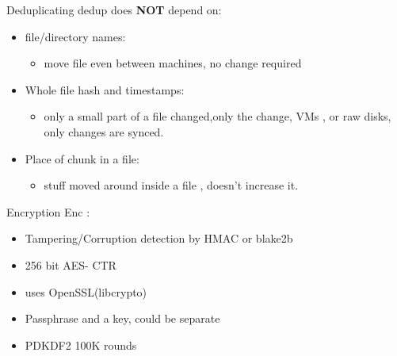 \documentclass{beamer}
\begin{document}
\begin{frame}{Deduplicating}
	dedup does \textbf{NOT} depend on:
	\begin{itemize}
		\item file/directory names: 
		\begin{itemize}
			\item move file even between machines, no change required
		\end{itemize}
		 \item Whole file hash and timestamps:
		 \begin{itemize} 
		 	\item only a small part of a file changed,only the change, VMs , or raw disks, only changes are synced.
		\end{itemize}
		
		\item Place of chunk in a file:
		\begin{itemize}
			\item stuff moved around inside a file , doesn't increase it.
		\end{itemize} 
	
	\end{itemize}
\end{frame}

%	
%	
%	
%	

\begin{frame}{Encryption}
	Enc :
	\begin{itemize}
		\item  Tampering/Corruption detection by HMAC or blake2b
		
		\item 256 bit AES- CTR
		
		\item uses OpenSSL(libcrypto)
		
		\item Passphrase and a key, could be separate
		
		\item PDKDF2 100K rounds
		
	\end{itemize}
\end{frame}
\end{document}
